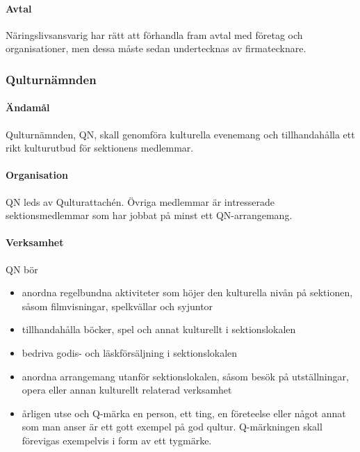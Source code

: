 \documentclass[a4paper,12pt]{article}
\begin{document}
\paragraph{Avtal}

Näringslivsansvarig har rätt att förhandla fram avtal med företag och organisationer, men dessa måste sedan undertecknas av firmatecknare.

\subsubsection{Qulturnämnden}

\paragraph{Ändamål}

Qulturnämnden, QN, skall genomföra kulturella evenemang och tillhandahålla ett rikt kulturutbud för sektionens medlemmar.

\paragraph{Organisation}

QN leds av Qulturattachén. Övriga medlemmar är intresserade sektionsmedlemmar som har jobbat på minst ett QN-arrangemang.

\paragraph{Verksamhet}

QN bör

\begin{itemize}
  \item anordna regelbundna aktiviteter som höjer den kulturella nivån på sektionen, såsom filmvisningar, spelkvällar och syjuntor
  \item tillhandahålla böcker, spel och annat kulturellt i sektionslokalen
  \item bedriva godis- och läskförsäljning i sektionslokalen
  \item anordna arrangemang utanför sektionslokalen, såsom besök på utställningar, opera eller annan kulturellt relaterad verksamhet
  \item årligen utse och Q-märka en person, ett ting, en företeelse eller något annat som man anser är ett gott exempel på god qultur. Q-märkningen skall förevigas exempelvis i form av ett tygmärke.
\end{itemize}
\end{document}
